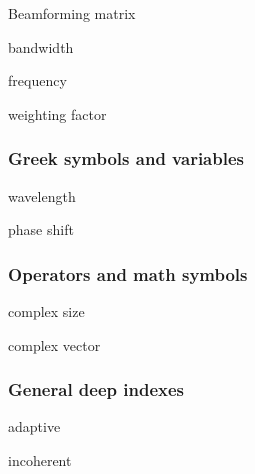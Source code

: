 \begin{description}[leftmargin=\widthof{\textbf{XXXXXXX}\hspace{\labelsep}},style=nextline]
	\item[$\mathbf{B}$] Beamforming matrix		\item[$B$] bandwidth
	\item[$f$] frequency
	\item[$g$] weighting factor
\end{description}




\subsubsection*{Greek symbols and variables}
\begin{description}[leftmargin=\widthof{\textbf{XXXXXXX}\hspace{\labelsep}},style=nextline]
	\item[$\lambda$] wavelength
	\item[$\varphi$] phase shift
\end{description}

\subsubsection*{Operators and math symbols}
\begin{description}[leftmargin=\widthof{\textbf{XXXXXXX}\hspace{\labelsep}},style=nextline]
	\item[$a$] complex size
	\item[$\vec a$] complex vector
\end{description}


\subsubsection*{General deep indexes}
\begin{description}[leftmargin=\widthof{\textbf{XXXXXXX}\hspace{\labelsep}},style=nextline]
	\item[$\mathrm{adapt}$] adaptive
	\item[$\mathrm{incoh}$] incoherent
\end{description}